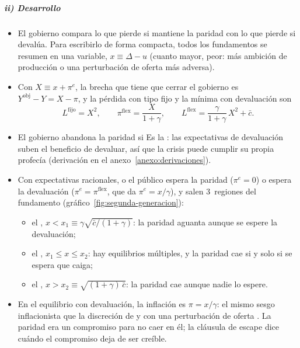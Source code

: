 \documentclass[11pt]{article}
\begin{document}
\subparagraph{ii) Desarrollo}

\begin{itemize}
\item El gobierno compara lo que pierde si mantiene la paridad con lo que pierde si devalúa. Para escribirlo de forma compacta, todos los fundamentos se resumen en una variable, $x\equiv\Delta-u$ (cuanto mayor, peor: más ambición de producción o una perturbación de oferta más adversa).
\item Con $X\equiv x+\pi^e$, la brecha que tiene que cerrar el gobierno es $Y^{\mathrm{obj}}-Y=X-\pi$, y la pérdida con tipo fijo y la mínima con devaluación son
  \begin{equation}\label{eq:perdidas-segunda}
  L^{\mathrm{fijo}}=X^2,\qquad \pi^{\mathrm{flex}}=\frac{X}{1+\gamma},\qquad L^{\mathrm{flex}}=\frac{\gamma}{1+\gamma}\,X^2+\bar c .
  \end{equation}
\item El gobierno abandona la paridad si
  Es la : las expectativas de devaluación suben el beneficio de devaluar, así que la crisis puede cumplir su propia profecía (derivación en el anexo~\ref{anexo:derivaciones}).
\item Con expectativas racionales, o el público espera la paridad ($\pi^e=0$) o espera la devaluación ($\pi^e=\pi^{\mathrm{flex}}$, que da $\pi^e=x/\gamma$), y salen 3~regiones del fundamento (gráfico~\ref{fig:segunda-generacion}):
  \begin{itemize}
  \item el , $x<x_1\equiv\gamma\sqrt{\bar c/(1+\gamma)}$: la paridad aguanta aunque se espere la devaluación;
  \item el , $x_1\le x\le x_2$: hay equilibrios múltiples, y la paridad cae si y solo si se espera que caiga;
  \item el , $x>x_2\equiv\sqrt{(1+\gamma)\,\bar c}$: la paridad cae aunque nadie lo espere.
  \end{itemize}
\item En el equilibrio con devaluación, la inflación es $\pi=x/\gamma$: el mismo sesgo inflacionista que la discreción de  y  con una perturbación de oferta . La paridad era un compromiso para no caer en él; la cláusula de escape dice cuándo el compromiso deja de ser creíble.
\end{itemize}
\end{document}
